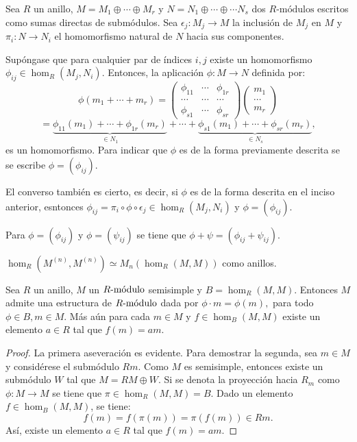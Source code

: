 \begin{lema}\label{lema:estructuraSemi}
Sea $R$ un anillo, $M = M_1 \oplus \cdots \oplus M_r$ y $N = N_1 \oplus \cdots \oplus \cdots N_s$ dos $R\mbox{-módulos}$ escritos como sumas directas de submódulos. Sea $\epsilon_j \colon M_j \to M$ la inclusión de $M_j$ en $M$ y $\pi_i \colon N \to N_i$ el homomorfismo natural de $N$ hacia sus componentes.
\begin{bulletList}
\item Supóngase que para cualquier par de índices $i,j$ existe un homomorfismo $\phi_{ij} \in \hom_R(M_j, N_i)$. Entonces,  la aplicación $\phi \colon M \to N$ definida por: \[\phi(m_1 + \cdots + m_r) = \begin{pmatrix}
\phi_{11} & \cdots & \phi_{1r} \\
\cdots & \cdots & \cdots \\
\phi_{s1} & \cdots & \phi_{sr}
\end{pmatrix} 
\begin{pmatrix}
m_1 \\
\cdots \\
m_r
\end{pmatrix}\]
\[ = \underset{\in N_1}{\underbrace{\phi_{11}(m_1) + \cdots + \phi_{1r}(m_r)}} +\cdots+\underset{\in N_s}{\underbrace{\phi_{s1}(m_1) + \cdots + \phi_{sr}(m_r)}}, \] es un homomorfismo. Para indicar que $\phi$ es de la forma previamente descrita se se escribe $\phi = (\phi_{ij})$.
\item El converso también es cierto, es decir, si $\phi$ es de la forma descrita en el inciso anterior, esntonces $\phi_{ij} = \pi_i\circ\phi\circ\epsilon_j \in \hom_R(M_j, N_i)$ y $\phi = (\phi_{ij})$.
\item Para $\phi = (\phi_{ij})$ y $\phi = (\psi_{ij})$ se tiene que $\phi + \psi = (\phi_{ij} +  \psi_{ij})$.
\item $\hom_R(M^{(n)}, M^{(n)}) \simeq M_n(\hom_R(M,M))$ como anillos. 
\end{bulletList} 
\end{lema}
\begin{lema}
Sea $R$ un anillo, $M$ un $\modulo{R}$ semisimple y $B= \hom_R(M,M)$. Entonces $M$  admite una estructura de $\modulo{B}$ dada por $\phi \cdot m = \phi(m),$ para todo $\phi \in B, m \in M$. Más aún para cada $m \in M$ y $f \in \hom_B(M,M)$ existe un elemento $a \in R$ tal que $f(m) = am$.  
\end{lema}
\begin{proof}
La primera aseveración es evidente. Para demostrar la segunda, sea $m \in M$ y considérese el submódulo $Rm$. Como $M$ es semisimple, entonces existe un submódulo $W$ tal que $M = RM \oplus W$. Si se denota  la proyección hacia $R_m$ como $\phi \colon M \to M$ se tiene que $\pi \in \hom_R(M,M) = B$. Dado un elemento $f \in \hom_B(M,M)$, se tiene:\[ f(m) = f(\pi(m)) = \pi(f(m)) \in Rm. \] Así, existe un elemento $a \in R$ tal que $f(m) = am$. 
\end{proof}
